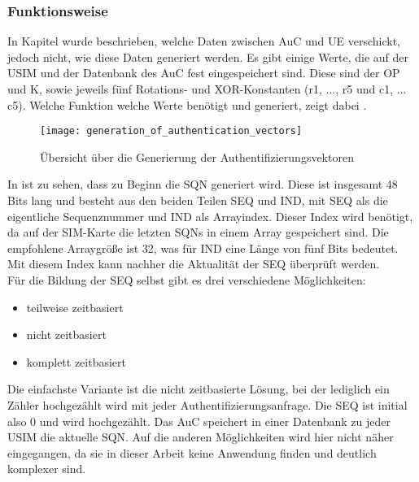 
 \subsubsection[Funktionsweise (Heumann)]{Funktionsweise}
 \label{milenage-funktion}
 In Kapitel  wurde beschrieben, welche Daten zwischen
 \ac{AuC} und \ac{UE} verschickt, jedoch nicht, wie diese Daten generiert werden. Es
 gibt einige Werte, die auf der \ac{USIM} und der Datenbank des \ac{AuC} fest eingespeichert
 sind. Diese sind der \ac{OP} und K, sowie jeweils fünf Rotations- und XOR-Konstanten
 (r1, ..., r5 und c1, ... c5). Welche Funktion welche Werte benötigt und generiert, zeigt dabei .
 
 \begin{figure}[htp]
  \begin{center}
   \texttt{[image: generation\_of\_authentication\_vectors]}
  \end{center}
  \caption[Übersicht über die Generierung der Authentifizierungsvektoren]{Übersicht über die Generierung der Authentifizierungsvektoren \cite{3gpp.33.102}}
  \label{fig:funktionsubersicht}
 \end{figure}
 
 In  ist zu sehen, dass zu Beginn die \ac{SQN} generiert wird.
 Diese ist insgesamt 48 Bits lang und besteht aus den beiden Teilen SEQ und IND, mit SEQ als
 die eigentliche Sequenznummer und IND als Arrayindex. Dieser Index wird benötigt, da auf
 der SIM-Karte die letzten SQNs in einem Array gespeichert sind. Die empfohlene Arraygröße ist
 32, was für IND eine Länge von fünf Bits bedeutet. Mit diesem Index kann nachher die
 Aktualität der SEQ überprüft werden.\cite{3gpp.33.102} \\
 Für die Bildung der SEQ selbst gibt es drei verschiedene Möglichkeiten:
 \begin{itemize}
  \item teilweise zeitbasiert
  \item nicht zeitbasiert
  \item komplett zeitbasiert
 \end{itemize}
 
 Die einfachste Variante ist die nicht zeitbasierte Lösung, bei der lediglich ein Zähler hochgezählt
 wird mit jeder Authentifizierungsanfrage. Die SEQ ist initial also 0 und wird hochgezählt. Das
 \ac{AuC} speichert in einer Datenbank \cite{3gpp.33.102} zu jeder USIM die aktuelle SQN.
 Auf die anderen  Möglichkeiten wird hier nicht näher eingegangen, da sie in dieser Arbeit
 keine Anwendung finden und deutlich komplexer sind.
 
